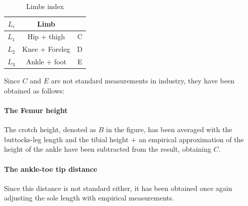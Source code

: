 \begin{table}
\begin{center}
	\begin{tabular}{c | c | c}
	  $L_{i}$ & Limb \\
	  \hline
	  $L_{1}$ & Hip + thigh & C \\
	  $L_{2}$ & Knee + Foreleg & D\\
	  $L_{3}$ & Ankle + foot & E 
	\end{tabular}
	\caption{Limbs index}
	\label{tab:limb_index}
\end{center}
\end{table}

Since $C$ and $E$ are not standard measurements in industry, they have been obtained as follows:

\paragraph{The Femur height}
The crotch height, denoted as $B$ in the figure, has been averaged with the buttocks-leg length and the tibial height + an empirical approximation of the height of the ankle have been subtracted from the result, obtaining $C$.

\paragraph{The ankle-toe tip distance}
Since this distance is not standard either, it has been obtained once again adjusting the sole length with empirical measurements.



